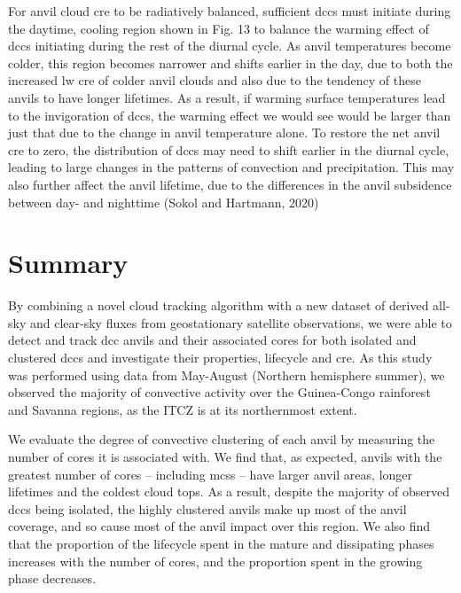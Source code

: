 For anvil cloud \acrshort{cre} to be radiatively balanced, sufficient \acrshort{dcc}s must
initiate during the daytime, cooling region shown in Fig. 13 to balance
the warming effect of \acrshort{dcc}s initiating during the rest of the diurnal
cycle. As anvil temperatures become colder, this region becomes narrower
and shifts earlier in the day, due to both the increased \acrshort{lw} \acrshort{cre} of
colder anvil clouds and also due to the tendency of these anvils to have
longer lifetimes. As a result, if warming surface temperatures lead to
the invigoration of \acrshort{dcc}s, the warming effect we would see would be
larger than just that due to the change in anvil temperature alone. To
restore the net anvil \acrshort{cre} to zero, the distribution of \acrshort{dcc}s may need to
shift earlier in the diurnal cycle, leading to large changes in the
patterns of convection and precipitation. This may also further affect
the anvil lifetime, due to the differences in the anvil subsidence
between day- and nighttime (Sokol and Hartmann, 2020)

\section{Summary}

By combining a novel cloud tracking algorithm with a new dataset of
derived all-sky and clear-sky fluxes from geostationary satellite
observations, we were able to detect and track \acrshort{dcc} anvils and their
associated cores for both isolated and clustered \acrshort{dcc}s and investigate
their properties, lifecycle and \acrshort{cre}. As this study was performed using
data from May-August (Northern hemisphere summer), we observed the
majority of convective activity over the Guinea-Congo rainforest and
Savanna regions, as the ITCZ is at its northernmost extent.

We evaluate the degree of convective clustering of each anvil by
measuring the number of cores it is associated with. We find that, as
expected, anvils with the greatest number of cores -- including \acrshort{mcs}s --
have larger anvil areas, longer lifetimes and the coldest cloud tops. As
a result, despite the majority of observed \acrshort{dcc}s being isolated, the
highly clustered anvils make up most of the anvil coverage, and so cause
most of the anvil impact over this region. We also find that the
proportion of the lifecycle spent in the mature and dissipating phases
increases with the number of cores, and the proportion spent in the
growing phase decreases.

